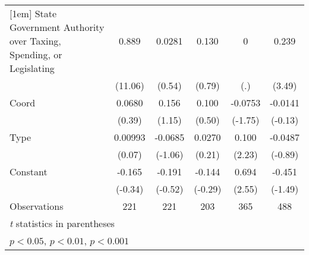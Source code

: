 {\begin{tabular}{l*{5}{c}}
[1em]
State Government Authority over Taxing, Spending, or Legislating&    0.889\sym{***}&   0.0281         &    0.130         &        0         &    0.239\sym{**} \\
                &  (11.06)         &   (0.54)         &   (0.79)         &      (.)         &   (3.49)         \\
[1em]
Coord           &   0.0680         &    0.156         &    0.100         &  -0.0753         &  -0.0141         \\
                &   (0.39)         &   (1.15)         &   (0.50)         &  (-1.75)         &  (-0.13)         \\
[1em]
Type            &  0.00993         &  -0.0685         &   0.0270         &    0.100\sym{*}  &  -0.0487         \\
                &   (0.07)         &  (-1.06)         &   (0.21)         &   (2.23)         &  (-0.89)         \\
[1em]
Constant        &   -0.165         &   -0.191         &   -0.144         &    0.694\sym{*}  &   -0.451         \\
                &  (-0.34)         &  (-0.52)         &  (-0.29)         &   (2.55)         &  (-1.49)         \\
\hline
Observations    &      221         &      221         &      203         &      365         &      488         \\
\hline\hline
\multicolumn{6}{l}{\footnotesize \textit{t} statistics in parentheses}\\
\multicolumn{6}{l}{\footnotesize \sym{*} \(p<0.05\), \sym{**} \(p<0.01\), \sym{***} \(p<0.001\)}\\
\end{tabular}
}
